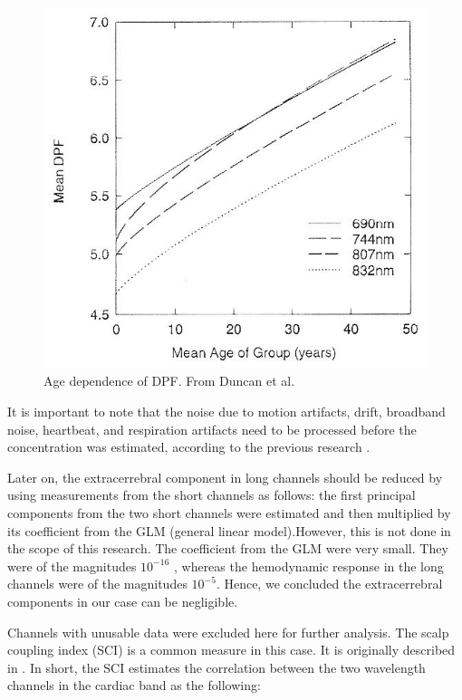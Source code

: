 \begin{figure}[H]
  \centering
    \includegraphics[scale=.45]{bilder/fig3_duncan.jpg}
  \caption{Age dependence of DPF. From Duncan et al.}
  \label{fig:somesignal}
\end{figure}

It is important to note that the noise due to motion artifacts, drift, broadband noise, heartbeat, and respiration artifacts need to be processed before the concentration was estimated, according to the previous research \cite {Huppert:09}.

Later on, the extracerrebral component in long channels should be reduced by using measurements from the short channels as follows: the first principal components from the two short channels were estimated and then multiplied by its coefficient from the GLM (general linear model).However, this is not done in the scope of this research. The coefficient from the GLM were very small. They were of the magnitudes $10^{-16}$ , whereas the hemodynamic response in the long channels were of the magnitudes $10^{-5}$. Hence, we concluded the extracerrebral components in our case can be negligible.

Channels with unusable data were excluded here for further analysis. The scalp coupling index (SCI) is a common measure in this case. It is originally described in \cite {Pollonini2013}. In short, the SCI estimates the correlation between the two wavelength channels in the cardiac band as the following:

